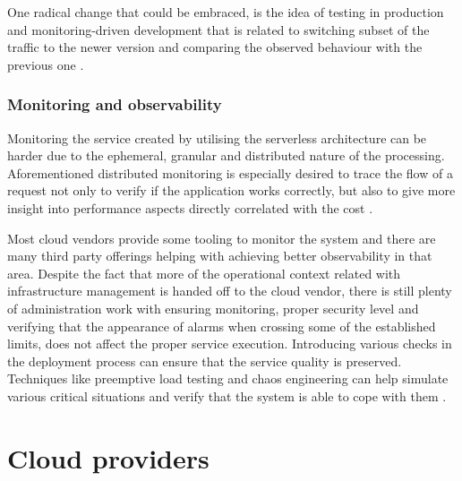 One radical change that could be embraced, is the idea of testing in production and monitoring-driven development that is related to switching subset of the traffic to the newer version and comparing the observed behaviour with the previous one \cite{MartinFowlerServerless}.

\subsubsection*{Monitoring and observability}

Monitoring the service created by utilising the serverless architecture can be harder due to the ephemeral, granular and distributed nature of the processing. Aforementioned distributed monitoring is especially desired to trace the flow of a request not only to verify if the application works correctly, but also to give more insight into performance aspects directly correlated with the cost \cite{LeveragingServerlessCloudComputingArchitectures}.

Most cloud vendors provide some tooling to monitor the system and there are many third party offerings helping with achieving better observability in that area. Despite the fact that more of the operational context related with infrastructure management is handed off to the cloud vendor, there is still plenty of administration work with ensuring monitoring, proper security level and verifying that the appearance of alarms when crossing some of the established limits, does not affect the proper service execution. Introducing various checks in the deployment process can ensure that the service quality is preserved. Techniques like preemptive load testing and chaos engineering can help simulate various critical situations and verify that the system is able to cope with them \cite{MartinFowlerServerless}.

\section{Cloud providers}

